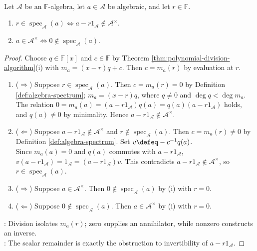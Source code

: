 \begin{theorem} \label{thm:minimal-polynomial-roots-by-algebra-invertibility} \\
Let $\mathcal{A}$ be an $\mathbb{F}$-algebra, let $a\in\mathcal{A}$ be algebraic, and let $r\in\mathbb{F}$.
\begin{enumerate}[label=(\roman*)]
\setlength{\itemsep}{0pt}
\item $r\in\operatorname{spec}_{\mathcal{A}}(a)\Longleftrightarrow a-r1_{\mathcal{A}}\notin\mathcal{A}^{\times}$.
\item $a\in\mathcal{A}^{\times}\Longleftrightarrow0\notin\operatorname{spec}_{\mathcal{A}}(a)$.
\end{enumerate}
\begin{proof}
Choose $q\in\mathbb{F}[x]$ and $c\in\mathbb{F}$ by Theorem \ref{thm:polynomial-division-algorithm}(i) with $m_a=(x-r)q+c$. Then $c=m_a(r)$ by evaluation at $r$.
\begin{enumerate}[label=(\roman*)]
\setlength{\itemsep}{0pt}
\item[$(i)$] ($\Rightarrow$) Suppose $r\in\operatorname{spec}_{\mathcal{A}}(a)$. Then $c=m_a(r)=0$ by Definition \ref{def:algebra-spectrum}; $m_a=(x-r)q$, where $q\neq0$ and $\deg q<\deg m_a$.\\
The relation $0=m_a(a)=(a-r1_{\mathcal{A}})q(a)=q(a)(a-r1_{\mathcal{A}})$ holds, and $q(a)\neq0$ by minimality. Hence $a-r1_{\mathcal{A}}\notin\mathcal{A}^{\times}$.
\item[$(i)$] ($\Leftarrow$) Suppose $a-r1_{\mathcal{A}}\notin\mathcal{A}^{\times}$ and $r\notin\operatorname{spec}_{\mathcal{A}}(a)$. Then $c=m_a(r)\neq0$ by Definition \ref{def:algebra-spectrum}. Set $v\defeq-c^{-1}q(a)$.\\
Since $m_a(a)=0$ and $q(a)$ commutes with $a-r1_{\mathcal{A}}$, $v(a-r1_{\mathcal{A}})=1_{\mathcal{A}}=(a-r1_{\mathcal{A}})v$. This contradicts $a-r1_{\mathcal{A}}\notin\mathcal{A}^{\times}$, so $r\in\operatorname{spec}_{\mathcal{A}}(a)$.
\item[$(ii)$] ($\Rightarrow$) Suppose $a\in\mathcal{A}^{\times}$. Then $0\notin\operatorname{spec}_{\mathcal{A}}(a)$ by (i) with $r=0$.
\item[$(ii)$] ($\Leftarrow$) Suppose $0\notin\operatorname{spec}_{\mathcal{A}}(a)$. Then $a\in\mathcal{A}^{\times}$ by (i) with $r=0$.
\end{enumerate}
: Division isolates $m_a(r)$; zero supplies an annihilator, while nonzero constructs an inverse.\\
: The scalar remainder is exactly the obstruction to invertibility of $a-r1_{\mathcal{A}}$.
\end{proof}
\end{theorem}

